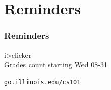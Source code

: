 \documentclass[11pt]{beamer}
\begin{document}
\section{Reminders}

\begin{frame}
  \frametitle{Reminders}
  \Enlarge

  \begin{itemize}
  \myitem i>clicker \\ \textcolor{CS101GradBot}{\footnotesize\hspace{1em} Grades count starting Wed 08-31}
  \end{itemize}
  \begin{center}
    \textcolor{CS101Base}{\Huge \texttt{go.illinois.edu/cs101}}
  \end{center}
\end{frame}
\end{document}
